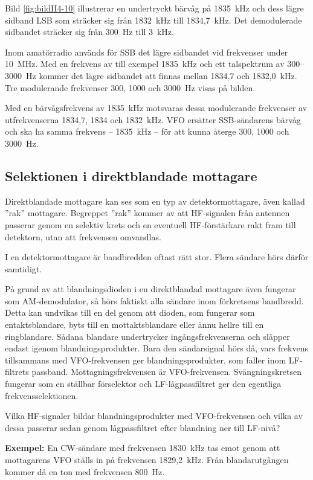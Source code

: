 Bild \ref{fig:bildII4-10} illustrerar en undertryckt bärvåg på 1835~kHz och
dess lägre sidband LSB som sträcker sig från 1832~kHz till 1834,7~kHz.
Det demodulerade sidbandet sträcker sig från 300~Hz till 3~kHz.

Inom amatörradio används för SSB det lägre sidbandet vid frekvenser
under 10~MHz.
Med en frekvens av till exempel 1835~kHz och ett talspektrum av 300--3000~Hz kommer
det lägre sidbandet att finnas mellan 1834,7 och 1832,0~kHz.
Tre modulerande frekvenser 300, 1000 och 3000~Hz visas på bilden.

Med en bärvågsfrekvens av 1835~kHz motsvaras dessa modulerande
frekvenser av utfrekvenserna 1834,7, 1834 och 1832~kHz.
VFO ersätter SSB-sändarens bärvåg och ska ha samma frekvens -- 1835~kHz --
för att kunna återge 300, 1000 och 3000~Hz.

\subsection{Selektionen i direktblandade mottagare}

Direktblandade mottagare kan ses som en typ av detektormottagare, även
kallad ''rak'' mottagare.
Begreppet ''rak'' kommer av att HF-signalen från antennen passerar genom en
selektiv krets och en eventuell HF-förstärkare rakt fram till detektorn,
utan att frekvensen omvandlas.

I en detektormottagare är bandbredden oftast rätt stor.
Flera sändare hörs därför samtidigt.

På grund av att blandningsdioden i en direktblandad mottagare även fungerar
som AM-demodulator, så hörs faktiskt alla sändare inom förkretsens bandbredd.
Detta kan undvikas till en del genom att dioden, som fungerar som
entaktsblandare, byts till en mottaktsblandare eller ännu hellre till en
ringblandare.
Sådana blandare undertrycker ingångsfrekvenserna och släpper endast igenom
blandningsprodukter.
Bara den sändarsignal hörs då, vars frekvens tillsammans med VFO-frekvensen
ger blandningsprodukter, som faller inom LF-filtrets passband.
Mottagningsfrekvensen är VFO-frekvensen.
Svängningskretsen fungerar som en ställbar förselektor och LF-lågpassfiltret
ger den egentliga frekvensselektionen.

Vilka HF-signaler bildar blandningsprodukter med VFO-frekvensen och
vilka av dessa passerar sedan genom lågpassfiltret efter blandning ner
till LF-nivå?

\textbf{Exempel:}
En CW-sändare med frekvensen 1830~kHz tas emot genom att
mottagarens VFO ställs in på frekvensen 1829,2~kHz.
Från blandarutgången kommer då en ton med frekvensen 800~Hz.

